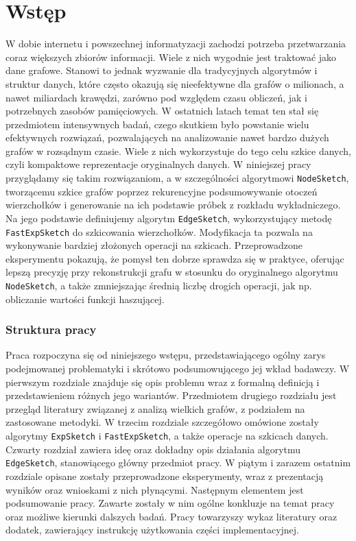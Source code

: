 \chapter*{Wstęp}

W dobie internetu i powszechnej informatyzacji zachodzi potrzeba przetwarzania coraz większych zbiorów informacji. Wiele z nich wygodnie jest traktować jako dane grafowe. Stanowi to jednak wyzwanie dla tradycyjnych algorytmów i struktur danych, które często okazują się nieefektywne dla grafów o milionach, a nawet miliardach krawędzi, zarówno pod względem czasu obliczeń, jak i potrzebnych zasobów pamięciowych.
W ostatnich latach temat ten stał się przedmiotem intensywnych badań, czego skutkiem było powstanie wielu efektywnych rozwiązań, pozwalających na analizowanie nawet bardzo dużych grafów w rozsądnym czasie. Wiele z nich wykorzystuje do tego celu szkice danych, czyli kompaktowe reprezentacje oryginalnych danych. W niniejszej pracy przyglądamy się takim rozwiązaniom, a w szczególności algorytmowi \texttt{NodeSketch}\cite{Yang_Rosso_Li_Cudre-Mauroux_2019}, tworzącemu szkice grafów poprzez rekurencyjne podsumowywanie otoczeń wierzchołków i generowanie na ich podstawie próbek z rozkładu wykładniczego. Na jego podstawie definiujemy algorytm \texttt{EdgeSketch}, wykorzystujący metodę \texttt{FastExpSketch}\cite{Lemiesz_2023} do szkicowania wierzchołków. Modyfikacja ta pozwala na wykonywanie bardziej złożonych operacji na szkicach. Przeprowadzone eksperymentu pokazują, że pomysł ten dobrze sprawdza się w praktyce, oferując lepszą precyzję przy rekonstrukcji grafu w stosunku do oryginalnego algorytmu \texttt{NodeSketch}, a także zmniejszając średnią liczbę drogich operacji, jak np. obliczanie wartości funkcji haszującej.   

\subsection*{Struktura pracy}
Praca rozpoczyna się od niniejszego wstępu, przedstawiającego ogólny zarys podejmowanej problematyki i skrótowo podsumowującego jej wkład badawczy. W pierwszym rozdziale znajduje się opis problemu wraz z formalną definicją i przedstawieniem różnych jego wariantów. Przedmiotem drugiego rozdziału jest przegląd literatury związanej z analizą wielkich grafów, z podziałem na zastosowane metodyki. W trzecim rozdziale szczegółowo omówione zostały algorytmy \texttt{ExpSketch} i \texttt{FastExpSketch}, a także operacje na szkicach danych. Czwarty rozdział zawiera ideę oraz dokładny opis działania algorytmu \texttt{EdgeSketch}, stanowiącego główny przedmiot pracy. W piątym i zarazem ostatnim rozdziale opisane zostały przeprowadzone eksperymenty, wraz z prezentacją wyników oraz wnioskami z nich płynącymi. Następnym elementem jest podsumowanie pracy. Zawarte zostały w nim ogólne konkluzje na temat pracy oraz możliwe kierunki dalszych badań. Pracy towarzyszy wykaz literatury oraz dodatek, zawierający instrukcję użytkowania części implementacyjnej. 
